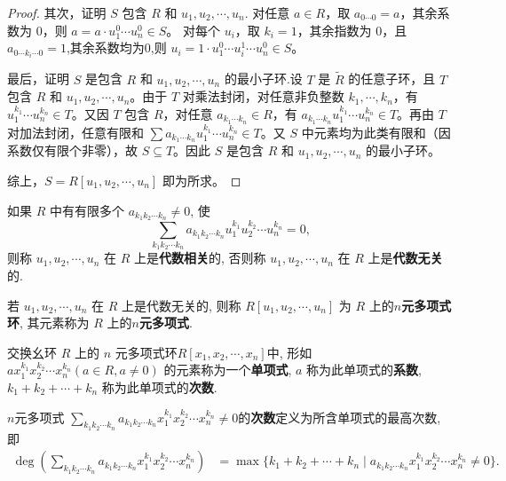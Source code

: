 \documentclass[../../main.tex]{subfiles}%
\begin{document}
\begin{proof}
其次，证明 \( S \) 包含 \( R \) 和 \( u_1, u_2, \cdots, u_n \).
对任意 \( a \in R \)，取 \( a_{0 \cdots 0} = a \)，其余系数为 0，则 \( a = a \cdot u_1^0 \cdots u_n^0 \in S \)。
对每个 \( u_i \)，取 \( k_i = 1 \)，其余指数为 0，且$a_{0\cdots k_i\cdots 0}=1$,其余系数均为0,则 \( u_i = 1 \cdot u_1^0 \cdots u_i^1 \cdots u_n^0 \in S \)。

最后，证明 \( S \) 是包含 \( R \) 和 \( u_1, u_2, \cdots, u_n \) 的最小子环.设 \( T \) 是 \( \widetilde{R} \) 的任意子环，且 \( T \) 包含 \( R \) 和 \( u_1, u_2, \cdots, u_n \)。由于 \( T \) 对乘法封闭，对任意非负整数 \( k_1, \cdots, k_n \)，有 \( u_1^{k_1} \cdots u_n^{k_n} \in T \)。又因 \( T \) 包含 \( R \)，对任意 \( a_{k_1 \cdots k_n} \in R \)，有 \( a_{k_1 \cdots k_n} u_1^{k_1} \cdots u_n^{k_n} \in T \)。再由 \( T \) 对加法封闭，任意有限和 \( \sum a_{k_1 \cdots k_n} u_1^{k_1} \cdots u_n^{k_n} \in T \)。又 \( S \) 中元素均为此类有限和（因系数仅有限个非零），故 \( S \subseteq T \)。因此 \( S \) 是包含 \( R \) 和 \( u_1, u_2, \cdots, u_n \) 的最小子环。

综上，\( S = R[u_1, u_2, \cdots, u_n] \) 即为所求。
\end{proof}

\begin{definition}
如果 \( R \) 中有有限多个 \( a_{k_1 k_2 \cdots k_n} \neq 0 \), 使
\[
\sum_{k_1 k_2 \cdots k_n} a_{k_1 k_2 \cdots k_n} u_1^{k_1} u_2^{k_2} \cdots u_n^{k_n} = 0,
\]
则称 \( u_1, u_2, \cdots, u_n \) 在 \( R \) 上是\textbf{代数相关}的, 否则称 \( u_1, u_2, \cdots, u_n \) 在 \( R \) 上是\textbf{代数无关}的.

若 \( u_1, u_2, \cdots, u_n \) 在 \( R \) 上是代数无关的, 则称 \( R[u_1, u_2, \cdots, u_n] \) 为 \( R \) 上的\textbf{$n$元多项式环}, 其元素称为 \( R \) 上的\textbf{$n$元多项式}.

交换幺环 \( R \) 上的 \( n \) 元多项式环\( R[x_1, x_2, \cdots, x_n] \)中, 形如 \( a x_1^{k_1} x_2^{k_2} \cdots x_n^{k_n} (a \in R, a \neq 0) \) 的元素称为一个\textbf{单项式}, \( a \) 称为此单项式的\textbf{系数}, \( k_1 + k_2 + \cdots + k_n \) 称为此单项式的\textbf{次数}.

$n$元多项式 \( \sum_{k_1 k_2 \cdots k_n} a_{k_1 k_2 \cdots k_n} x_1^{k_1} x_2^{k_2} \cdots x_n^{k_n} \neq 0 \)的\textbf{次数}定义为所含单项式的最高次数, 即
\begin{align*}
\deg \left( \sum_{k_1 k_2 \cdots k_n} a_{k_1 k_2 \cdots k_n} x_1^{k_1} x_2^{k_2} \cdots x_n^{k_n} \right) &= \max \{ k_1 + k_2 + \cdots + k_n \mid a_{k_1 k_2 \cdots k_n} x_1^{k_1} x_2^{k_2} \cdots x_n^{k_n} \neq 0 \}.
\end{align*}
\end{definition}
\end{document}
